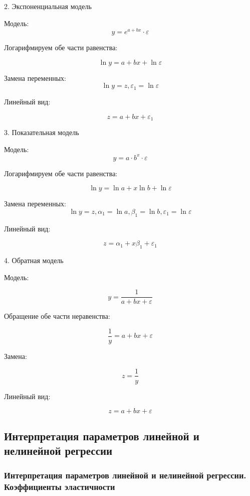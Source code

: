 \documentclass[aps,%
12pt,%
final,%
oneside,
onecolumn,%
musixtex, %
superscriptaddress,%
centertags]{article} %
\theoremstyle{plain}
\theoremstyle{definition}
\theoremstyle{remark}
\begin{document}
\begin{center} 2. Экспоненциальная модель \end{center}

Модель:
$$ y = e^{a+bx} \cdot \varepsilon $$

Логарифмируем обе части равенства:

$$ \ln y = a + bx + \ln \varepsilon$$

Замена переменных:
$$ \ln y = z, \varepsilon_1 = \ln \varepsilon $$

Линейный вид:

$$ z = a + bx + \varepsilon_1 $$

\begin{center} 3. Показательная модель \end{center}

Модель:
$$ y = a \cdot b^x \cdot \varepsilon $$

Логарифмируем обе части равенства:

$$ \ln y = \ln a + x \ln b + \ln \varepsilon$$

Замена переменных:
$$ \ln y = z, \alpha_1 = \ln a, \beta_1 = \ln b, \varepsilon_1 = \ln \varepsilon $$

Линейный вид:

$$ z = \alpha_1 + x\beta_1 + \varepsilon_1 $$

\begin{center} 4. Обратная модель \end{center}

Модель:

$$ y = \frac{1}{a+bx+\varepsilon} $$

Обращение обе части неравенства:

$$ \frac{1}{y} = a + bx + \varepsilon $$

Замена:

$$ z =\frac{1}{y} $$

Линейный вид:

$$ z = a + bx + \varepsilon $$

\newpage
\subsection{Интерпретация параметров линейной и нелинейной регрессии}

\subsubsection{Интерпретация параметров линейной и нелинейной регрессии.  Коэффициенты эластичности}
\end{document}
